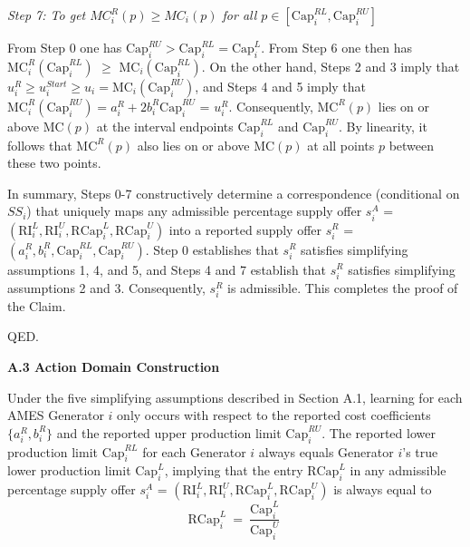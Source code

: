 \documentclass[12pt]{article}
\begin{document}
\bigskip
\noindent
\textit{Step 7: To get $MC^R_i(p) \ge MC_i(p)$ for all $p \in [\mbox{Cap}^{RL}_i,\mbox{Cap}^{RU}_i]$}
\bigskip

From Step 0 one has $\mbox{Cap}^{RU}_i > \mbox{Cap}^{RL}_i = \mbox{Cap}^L_i$.  From Step 6 one then has $\mbox{MC}^R_i(\mbox{Cap}^{RL}_i)$ $\ge$ $\mbox{MC}_i(\mbox{Cap}^{RL}_i)$.  On the other hand, Steps 2 and 3 imply that
$u^R_i \ge u^{Start}_i \ge u_i = \mbox{MC}_i(\mbox{Cap}^{RU}_i)$, and Steps 4 and 5 imply that
$\mbox{MC}^R_i(\mbox{Cap}^{RU}_i) = a^R_i + 2b^R_i\mbox{Cap}^{RU}_i$ = $u^R_i$.  Consequently,
$\mbox{MC}^R(p)$ lies on or above $\mbox{MC}(p)$ at the interval endpoints $\mbox{Cap}^{RL}_i$ and 
$\mbox{Cap}^{RU}_i$.  By linearity, it follows that $\mbox{MC}^R(p)$ also lies on or above $\mbox{MC}(p)$ at all points $p$ between these two points.  

\bigskip
\noindent
In summary, Steps 0-7 constructively determine a correspondence (conditional on $SS_i$) that uniquely maps any admissible percentage supply offer $s^A_i$ = $(\mbox{RI}^L_i, \mbox{RI}^U_i, \mbox{RCap}^L_i, \mbox{RCap}^U_i)$
into a reported supply offer $s^R_i$ = $(a_i^R, b_i^R, \mbox{Cap}^{RL}_i, \mbox{Cap}_i^{RU})$.  Step 0 establishes that $s^R_i$ satisfies simplifying assumptions 1, 4, and 5, and Steps 4 and 7 establish that $s^R_i$ satisfies simplifying assumptions 2 and 3.  Consequently, $s^R_i$ is admissible.  This completes the proof of the Claim.  

\hfill QED.



\bigskip
\noindent
\textbf{\large A.3  Action Domain Construction}

\medskip
\noindent
Under the five simplifying assumptions described in Section A.1, learning for each AMES Generator $i$ only occurs with respect to the reported cost coefficients $\{a^R_i, b^R_i\}$ and the reported upper production 
limit $\mbox{Cap}_i^{RU}$.  The reported lower production limit $\mbox{Cap}_i^{RL}$ for each Generator $i$ always equals Generator $i$'s true lower production limit $\mbox{Cap}_i^L$, implying that the entry $\mbox{RCap}^L_i$ in any admissible percentage supply offer $s^A_i$ = 
$(\mbox{RI}_i^L, \mbox{RI}_i^U, \mbox{RCap}_i^L, \mbox{RCap}_i^U)$ is always equal to 
             \begin{equation} \label{RCap.lower.SA}
	\mbox{RCap}_i^L  ~=~ \frac{\mbox{Cap}_i^{L}}{\mbox{Cap}_{i}^{U}} ~ 
                                      \end{equation}
\end{document}
